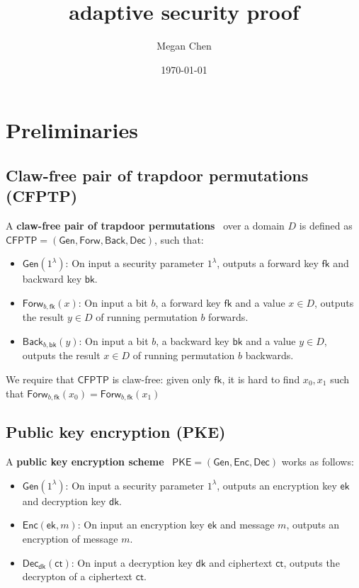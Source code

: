 \documentclass[11pt,letterpaper]{article}
\title{\cite{CanettiF01} adaptive security proof}
\author{Megan Chen}
\date{\today}
\renewcommand{\emph}[1]{\textbf{#1}~}
\newcommand{\doclearpage}{%
  \iffull\clearpage\else\fi
}
\theoremstyle{plain} %
\theoremstyle{definition} %
\theoremstyle{remark} %
\newcommand{\Input}{x}
\newcommand{\SecParam}{\lambda}
\newcommand{\PKE}{\mathsf{PKE}}
\newcommand{\Gen}{\mathsf{Gen}}
\newcommand{\Enc}{\mathsf{Enc}}
\newcommand{\Dec}{\mathsf{Dec}}
\newcommand{\EncKey}{\mathsf{ek}}
\newcommand{\DecKey}{\mathsf{dk}}
\newcommand{\Msg}{m}
\newcommand{\Ct}{\mathsf{ct}}
\newcommand{\CFPTP}{\mathsf{CFPTP}}
\newcommand{\Forw}{\mathsf{Forw}}
\newcommand{\Back}{\mathsf{Back}}
\newcommand{\ForwKey}{\mathsf{fk}}
\newcommand{\BackKey}{\mathsf{bk}}
\newcommand{\Domain}{D}
\newcommand{\CFPTPInput}{\Input}
\newcommand{\Output}{y}
\newcommand{\CFPTPBit}{b}
\begin{document}
\maketitle
\tableofcontents

\doclearpage
\section{Preliminaries}
\label{sec:preliminaries}

\subsection{Claw-free pair of trapdoor permutations (CFPTP)}
A \emph{claw-free pair of trapdoor permutations} over a domain $\Domain$ is defined as $\CFPTP = (\Gen, \Forw, \Back, \Dec)$, such that:
\begin{itemize}
	\item $\Gen(1^\SecParam)$: On input a security parameter $1^\SecParam$, outputs a forward key $\ForwKey$ and backward key $\BackKey$.
	\item $\Forw_{\CFPTPBit, \ForwKey}(\CFPTPInput)$: On input a bit $\CFPTPBit$, a forward key $\ForwKey$ and a value $\Input \in \Domain$, outputs the result $\Output \in \Domain$ of running permutation $\CFPTPBit$ forwards.
	\item $\Back_{\CFPTPBit, \BackKey}(\Output)$: On input a bit $\CFPTPBit$, a backward key $\BackKey$ and a value $\Output \in \Domain$, outputs the result $\Input \in \Domain$ of running permutation $b$ backwards.
\end{itemize}
We require that $\CFPTP$ is claw-free: given only $\ForwKey$, it is hard to find $\CFPTPInput_0, \CFPTPInput_1$ such that $\Forw_{\CFPTPBit, \ForwKey}(\CFPTPInput_0) = \Forw_{\CFPTPBit, \ForwKey}(\CFPTPInput_1)$

\subsection{Public key encryption (PKE)}

A \emph{public key encryption scheme} $\PKE = (\Gen, \Enc, \Dec)$ works as follows:
\begin{itemize}
	\item $\Gen(1^\SecParam)$: On input a security parameter $1^\SecParam$, outputs an encryption key $\EncKey$ and decryption key $\DecKey$.
	\item $\Enc(\EncKey,\Msg)$: On input an encryption key $\EncKey$ and message $\Msg$, outputs an encryption of message $\Msg$.
	\item $\Dec_{\DecKey}(\Ct)$: On input a decryption key $\DecKey$ and ciphertext $\Ct$, outputs the decrypton of a ciphertext $\Ct$.
\end{itemize}
\end{document}
